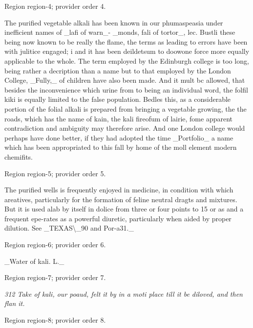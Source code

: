 \documentclass[11pt]{article}
\begin{document}
{\scriptsize\color{gray} Region region-4; provider order 4.\par}
\medskip

The purified vegetable alkali has been known in our phumaspeasia under inefficient names of \_lafi of warn\_- \_monds, fali of tortor\_, lec. Bustli these being now known to be really the flame, the terms as leading to errors have been with julitice engaged; i and it has been deildetsum to doowone force more equally applicable to the whole. The term employed by the Edinburgh college is too long, being rather a decription than a name but to that employed by the London College, \_Fully,\_ of children have also been made. And it mult bc allowed, that besides the inconvenience which urine from to being an individual word, the folfil kiki is equally limited to the false population. Bedles this, as a considerable portion of the folial alkali is prepared from bringing a vegetable growing, the the roads, which has the name of kain, the kali fireofum of lairie, fome apparent contradiction and ambiguity may therefore arise. And one London college would perhaps have done better, if they had adopted the time \_Portfolio\_ a name which has been appropriated to this fall by home of the moll element modern chemifits.
\par

{\scriptsize\color{gray} Region region-5; provider order 5.\par}
\medskip

The purified wells is frequently enjoyed in medicine, in condition with which areatives, particularly for the formation of feline neutral dragts and mixtures. But it is used alab by itself in dolice from three or four points to 15 or as and a frequent epe-rates as a powerful diuretic, particularly when aided by proper dilution. See \_TEXAS\textbackslash{}\_90 and Por-a31.\_
\par

{\scriptsize\color{gray} Region region-6; provider order 6.\par}
\medskip

\_Water of kali. L.\_
\par

{\scriptsize\color{gray} Region region-7; provider order 7.\par}
\medskip

{\small\itshape 312 Take of kali, our poaud, felt it by in a moti place till it be diloved, and then flan it.\par}

{\scriptsize\color{gray} Region region-8; provider order 8.\par}
\medskip
\end{document}
